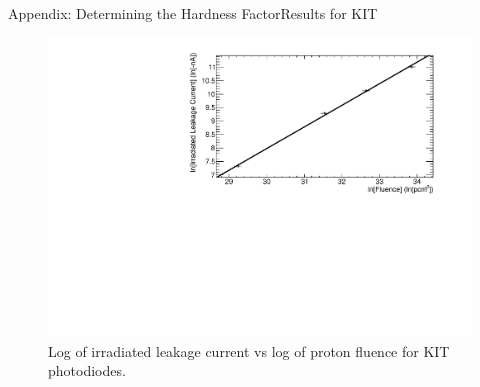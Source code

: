 \documentclass{beamer}
\begin{document}
    \begin{frame}{Appendix: Determining the Hardness Factor}{Results for KIT}
        \begin{figure}
            \centering
            \includegraphics[width=0.9\linewidth]{KIT_deltaI_fluence_2302_log.pdf}
            \caption{Log of irradiated leakage current vs log of proton fluence for KIT photodiodes.}
        \end{figure}
    \end{frame}
    
\end{document}
